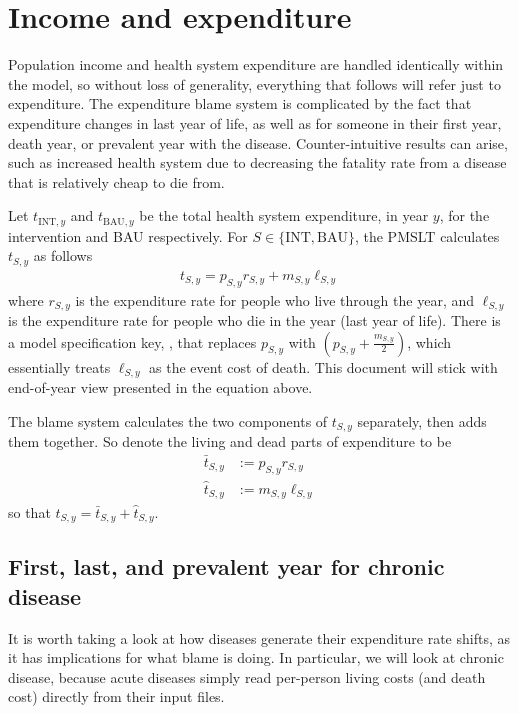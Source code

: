 \documentclass[]{article}
\begin{document}
\section{Income and expenditure}

Population income and health system expenditure are handled identically within the model, so without loss of generality, everything that follows will refer just to expenditure. The expenditure blame system is complicated by the fact that expenditure changes in last year of life, as well as for someone in their first year, death year, or prevalent year with the disease. Counter-intuitive results can arise, such as increased health system due to decreasing the fatality rate from a disease that is relatively cheap to die from.

Let $t_{\text{INT}, y}$ and $t_{\text{BAU}, y}$ be the total health system expenditure, in year $y$, for the intervention and BAU respectively. For $S \in \{\text{INT}, \text{BAU}\}$, the PMSLT calculates $t_{S, y}$ as follows
\begin{align*}
	t_{S, y} = p_{S, y} r_{S, y} + m_{S, y} \ell_{S, y}
\end{align*}
where $r_{S, y}$ is the expenditure rate for people who live through the year, and $\ell_{S, y}$ is the expenditure rate for people who die in the year (last year of life). There is a model specification key, , that replaces $p_{S, y}$ with $\left(p_{S, y} + \frac{m_{S, y}}{2}\right)$, which essentially treats $\ell_{S, y}$ as the event cost of death. This document will stick with end-of-year view presented in the equation above.

The blame system calculates the two components of $t_{S, y}$ separately, then adds them together. So denote the living and dead parts of expenditure to be
\begin{align*}
	\bar{t}_{S, y} &:= p_{S, y} r_{S, y} \\
	\widehat{t}_{S, y} &:= m_{S, y} \ell_{S, y}
\end{align*}
so that $t_{S, y} = \bar{t}_{S, y} + \widehat{t}_{S, y}$.

\subsection{First, last, and prevalent year for chronic disease}

It is worth taking a look at how diseases generate their expenditure rate shifts, as it has implications for what blame is doing. In particular, we will look at chronic disease, because acute diseases simply read per-person living costs (and death cost) directly from their input files.
\end{document}
